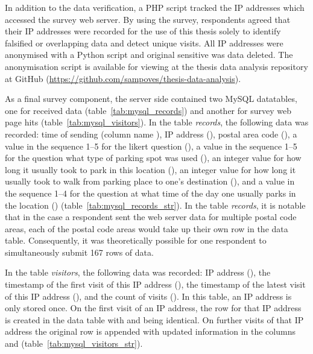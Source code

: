 In addition to the data verification, a PHP script tracked the IP addresses which accessed the survey web server. By using the survey, respondents agreed that their IP addresses were recorded for the use of this thesis solely to identify falsified or overlapping data and detect unique visits. All IP addresses were anonymised with a Python script and original sensitive was data deleted. The anonymisation script is available for viewing at the thesis data analysis repository at GitHub (\textcolor{blue}{\url{https://github.com/sampoves/thesis-data-analysis}}).

As a final survey component, the server side contained two MySQL datatables, one for received data (table~\ref{tab:mysql_records}) and another for survey web page hits (table~\ref{tab:mysql_visitors}). In the table \textit{records}, the following data was recorded: time of sending (column name ), IP address (), postal area code (), a value in the sequence 1--5 for the likert question (), a value in the sequence 1--5 for the question what type of parking spot was used (), an integer value for how long it usually took to park in this location (), an integer value for how long it usually took to walk from parking place to one's destination (), and a value in the sequence 1--4 for the question at what time of the day one usually parks in the location () (table~\ref{tab:mysql_records_str}). In the table \textit{records}, it is notable that in the case a respondent sent the web server data for multiple postal code areas, each of the postal code areas would take up their own row in the data table. Consequently, it was theoretically possible for one respondent to simultaneously submit 167 rows of data.

In the table \textit{visitors}, the following data was recorded: IP address (), the timestamp of the first visit of this IP address (), the timestamp of the latest visit of this IP address (), and the count of visits (). In this table, an IP address is only stored once. On the first visit of an IP address, the row for that IP address is created in the data table with  and  being identical. On further visits of that IP address the original row is appended with updated information in the columns  and  (table~\ref{tab:mysql_visitors_str}).

